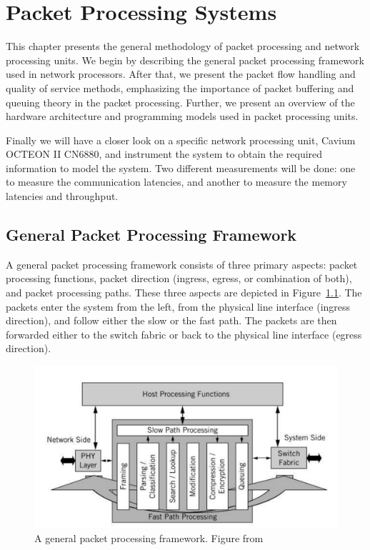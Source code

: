 \chapter{Packet Processing Systems}
\label{chapter:packet-processing-systems}

This chapter presents the general methodology of packet processing and network processing units. We begin by describing the general packet processing framework used in network processors. After that, we present the packet flow handling and quality of service methods, emphasizing the importance of packet buffering and queuing theory in the packet processing. Further, we present an overview of the hardware architecture and programming models used in packet processing units.

Finally we will have a closer look on a specific network processing unit, Cavium OCTEON II CN6880, and instrument the system to obtain the required information to model the system. Two different measurements will be done: one to measure the communication latencies, and another to measure the memory latencies and throughput.

\section{General Packet Processing Framework}

A general packet processing framework consists of three primary aspects: packet processing functions, packet direction (ingress, egress, or combination of both), and packet processing paths. These three aspects are depicted in Figure~\ref{fig:general-packet-processing-framework}. The packets enter the system from the left, from the physical line interface (ingress direction), and follow either the slow or the fast path. The packets are then forwarded either to the switch fabric or back to the physical line interface (egress direction).~\cite{Giladi:2008:Network}

\begin{figure}[]
  \begin{center}
    \includegraphics[width=\textwidth]{images/general-packet-processing-framework.png}
    \caption{A general packet processing framework. Figure from~\cite{Giladi:2008:Network}}
    \label{fig:general-packet-processing-framework}
  \end{center}
\end{figure}

